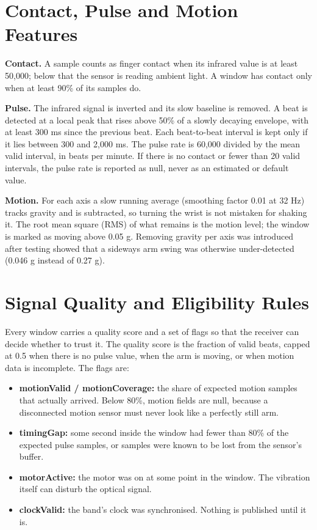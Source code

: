 \documentclass[12pt,letterpaper,oneside]{report}
\begin{document}
\section{Contact, Pulse and Motion Features}\label{sec:4.2}

\textbf{Contact.} A sample counts as finger contact when its infrared value is at least 50,000; below that the sensor is reading ambient light. A window has contact only when at least 90\% of its samples do.


\textbf{Pulse.} The infrared signal is inverted and its slow baseline is removed. A beat is detected at a local peak that rises above 50\% of a slowly decaying envelope, with at least 300 ms since the previous beat. Each beat-to-beat interval is kept only if it lies between 300 and 2,000 ms. The pulse rate is 60,000 divided by the mean valid interval, in beats per minute. If there is no contact or fewer than 20 valid intervals, the pulse rate is reported as null, never as an estimated or default value.


\textbf{Motion.} For each axis a slow running average (smoothing factor 0.01 at 32 Hz) tracks gravity and is subtracted, so turning the wrist is not mistaken for shaking it. The root mean square (RMS) of what remains is the motion level; the window is marked as moving above 0.05 g. Removing gravity per axis was introduced after testing showed that a sideways arm swing was otherwise under-detected (0.046 g instead of 0.27 g).


\section{Signal Quality and Eligibility Rules}\label{sec:4.3}

Every window carries a quality score and a set of flags so that the receiver can decide whether to trust it. The quality score is the fraction of valid beats, capped at 0.5 when there is no pulse value, when the arm is moving, or when motion data is incomplete. The flags are:


\begin{itemize}\item \textbf{motionValid / motionCoverage:} the share of expected motion samples that actually arrived. Below 80\%, motion fields are null, because a disconnected motion sensor must never look like a perfectly still arm.
\item \textbf{timingGap:} some second inside the window had fewer than 80\% of the expected pulse samples, or samples were known to be lost from the sensor's buffer.
\item \textbf{motorActive:} the motor was on at some point in the window. The vibration itself can disturb the optical signal.
\item \textbf{clockValid:} the band's clock was synchronised. Nothing is published until it is.
\end{itemize}
\end{document}
